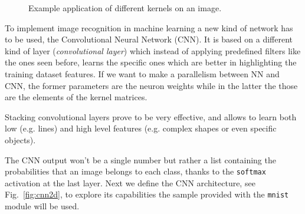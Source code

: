 \begin{figure}[!p]
{	}\quad
{}
\caption{Example application of different kernels on an image.}
\end{figure} 

To implement image recognition in machine learning a new kind of network has to be used, the Convolutional Neural Network (CNN). It is based on a different kind of layer (\emph{convolutional layer}) which instead of applying predefined filters like the ones seen before, learns the specific ones which are better in highlighting the training dataset features. If we want to make a parallelism between NN and CNN, the former parameters are the neuron weights while in the latter the those are the elements of the kernel matrices.

Stacking convolutional layers prove to be very effective, and allows to learn both low (e.g. lines) and high level features (e.g. complex shapes or even specific objects).

The CNN output won't be a single number but rather a list containing the probabilities that an image belongs to each class, thanks to the \texttt{softmax} activation at the last layer. 
Next we define the CNN architecture, see Fig.~\ref{fig:cnn2d}, to explore its capabilities the sample provided with the \texttt{mnist} module will be used.

